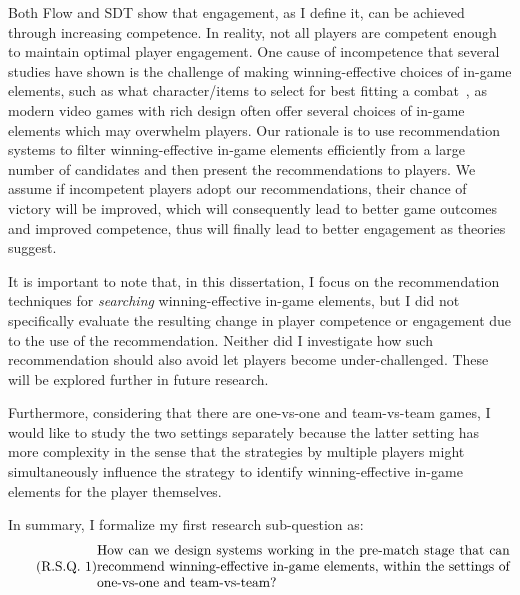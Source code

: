 Both Flow and SDT show that engagement, as I define it, can be achieved through increasing competence. In reality, not all players are competent enough to maintain optimal player engagement. One cause of incompetence that several studies have shown is the challenge of making winning-effective choices of in-game elements, such as what character/items to select for best fitting a combat~\citep{looi2018recommender,summerville2017reco,hanke2017reco}, as modern video games with rich design often offer several choices of in-game elements which may overwhelm players. Our rationale is to use recommendation systems to filter winning-effective in-game elements efficiently from a large number of candidates and then present the recommendations to players. We assume if incompetent players adopt our recommendations, their chance of victory will be improved, which will consequently lead to better game outcomes
and improved competence, thus will finally lead to better engagement as theories suggest.  


It is important to note that, in this dissertation, I focus on the recommendation techniques for \textit{searching} winning-effective in-game elements, but I did not specifically evaluate the resulting change in player competence or engagement due to the use of the recommendation. Neither did I investigate how such recommendation should also  avoid let players become under-challenged. These will be explored further in future research.


Furthermore, considering that there are one-vs-one and team-vs-team games, I would like to study the two settings separately because the latter setting has more complexity in the sense that the strategies by multiple players might simultaneously influence the strategy to identify winning-effective in-game elements for the player themselves. 


In summary, I formalize my first research sub-question as: 
\begin{equation}
  \tag{R.S.Q. 1}\label{rq1}
  \parbox{\dimexpr\linewidth-4em}{%
    \strut
    How can we design systems working in the pre-match stage that can recommend winning-effective in-game elements, within the settings of one-vs-one and team-vs-team?
    \strut
  }
\end{equation}



